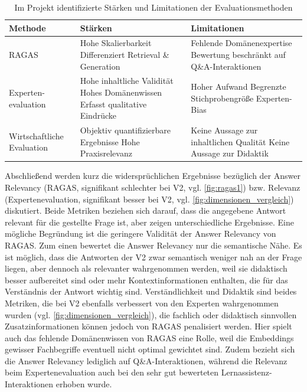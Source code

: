 \begin{table}[H]
\centering
\renewcommand{\arraystretch}{1.2}
\caption{Im Projekt identifizierte Stärken und Limitationen der Evaluationsmethoden}
\label{tab:refl_evaluationsmethoden}
\begin{tabular}{>{\raggedright\arraybackslash}p{2.8cm}>{\raggedright\arraybackslash}p{5.6cm}>{\raggedright\arraybackslash}p{5.6cm}}
\hline
\textbf{Methode} & \textbf{Stärken} & \textbf{Limitationen} \\
\hline
RAGAS & 
Hohe Skalierbarkeit\newline
Differenziert Retrieval \& Generation &
Fehlende Domänenexpertise\newline
Bewertung beschränkt auf Q\&A-Interaktionen \\[6pt]

Experten-evaluation & 
Hohe inhaltliche Validität\newline
Hohes Domänenwissen\newline
Erfasst qualitative Eindrücke &
Hoher Aufwand\newline
Begrenzte Stichprobengröße\newline
Experten-Bias \\[6pt]

Wirtschaftliche Evaluation & 
Objektiv quantifizierbare Ergebnisse\newline
Hohe Praxisrelevanz&
Keine Aussage zur inhaltlichen Qualität\newline
Keine Aussage zur Didaktik \\
\hline
\end{tabular}
\end{table}
\noindent
Abschließend werden kurz die widersprüchlichen Ergebnisse  bezüglich der Answer Relevancy (RAGAS, signifikant schlechter bei V2, vgl. \autoref{fig:ragas1}) bzw. Relevanz (Expertenevaluation, signifikant besser bei V2, vgl. \autoref{fig:dimensionen_vergleich}) diskutiert. Beide Metriken beziehen sich darauf, dass die angegebene Antwort relevant für die gestellte Frage ist, aber zeigen unterschiedliche Ergebnisse. Eine mögliche Begründung ist die geringere Validität der Answer Relevancy von RAGAS. Zum einen bewertet die Answer Relevancy nur die semantische Nähe. Es ist möglich, dass die Antworten der V2 zwar semantisch weniger nah an der Frage liegen, aber dennoch als relevanter wahrgenommen werden, weil sie didaktisch besser aufbereitet sind oder mehr Kontextinformationen enthalten, die für das Verständnis der Antwort wichtig sind. Verständlichkeit und Didaktik sind beides Metriken, die bei V2 ebenfalls verbessert von den Experten wahrgenommen wurden (vgl. \autoref{fig:dimensionen_vergleich}), die fachlich oder didaktisch sinnvollen Zusatzinformationen können jedoch von RAGAS penalisiert werden. Hier spielt auch das fehlende Domänenwissen von RAGAS eine Rolle, weil die Embeddings gewisser Fachbegriffe eventuell nicht optimal gewichtet sind. Zudem bezieht sich die Answer Relevancy lediglich auf Q\&A-Interaktionen, während die Relevanz beim Expertenevaluation auch bei den sehr gut bewerteten Lernassistenz-Interaktionen erhoben wurde. 

